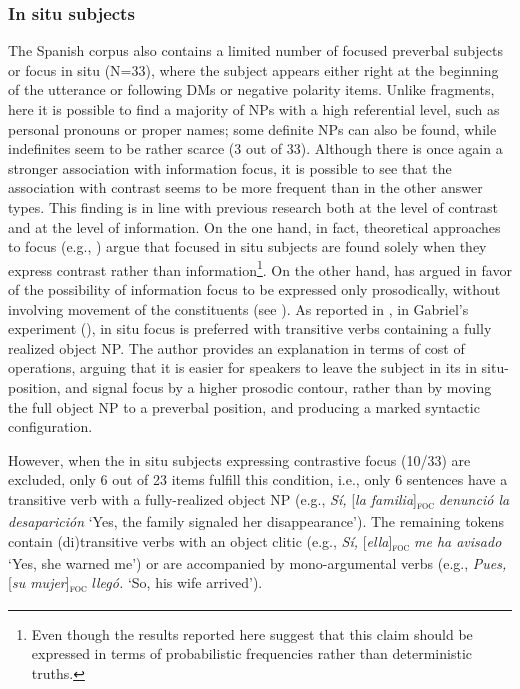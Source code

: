 {\subsubsection{In situ subjects} \label{sub:4.5.1.4}

The Spanish corpus also contains a limited number of focused preverbal subjects or focus in situ (N=33), where the subject appears either right at the beginning of the utterance or following DMs or negative polarity items. Unlike fragments, here it is possible to find a majority of NPs with a high referential level, such as personal pronouns or proper names; some definite NPs can also be found, while indefinites seem to be rather scarce (3 out of 33). 
Although there is once again a stronger association with information focus, it is possible to see that the association with contrast seems to be more frequent than in the other answer types. 
This finding is in line with previous research both at the level of contrast and at the level of information. On the one hand, in fact, theoretical approaches to focus (e.g., \cite{zubizarreta1998prosody}) argue that  focused in situ subjects are found solely when they express contrast rather than information\footnote{Even though the results reported here suggest that this claim should be expressed in terms of probabilistic frequencies rather than deterministic truths.}. On the other hand, \textcite{gabriel2007fokus} has argued in favor of the possibility of information focus to be expressed only prosodically, without involving movement of the constituents (see ). As reported in , in Gabriel's experiment (\citeyear{gabriel2007fokus}), in situ focus is preferred with transitive verbs containing a fully realized object NP. The author provides an explanation in terms of cost of operations, arguing that it is easier for speakers to leave the subject in its in situ-position, and signal focus by a higher prosodic contour, rather than by moving the full object NP to a preverbal position, and producing a marked syntactic configuration. 

However, when the in situ subjects expressing contrastive focus (10/33) are excluded, only 6 out of 23 items fulfill this condition, i.e., only 6 sentences have a transitive verb with a fully-realized object NP (e.g., \textit{Sí,} [\textit{\textit{la familia}}]\textsubscript{\textsc{foc}} \normalsize \textit{denunció la desaparición} `Yes, the family signaled her disappearance'). The remaining tokens contain (di)transitive verbs with an object clitic (e.g., \textit{Sí,} [\textit{\textit{ella}}]\textsubscript{\textsc{foc}} \normalsize \textit{me ha avisado} `Yes, she warned me') or are accompanied by mono-argumental verbs (e.g., \textit{Pues,} [\textit{\textit{su mujer}}]\textsubscript{\textsc{foc}} \normalsize \textit{llegó.} `So, his wife arrived').

}
